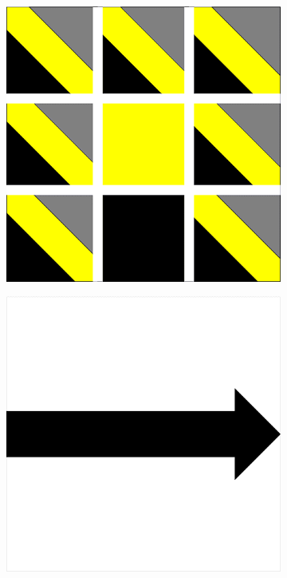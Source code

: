 \documentclass[a4paper]{article}
\begin{document}
\begin{figure}[!h]
    \centering
    \begin{subfigure}[t]{0.17\textwidth}
        \includegraphics[width=\textwidth]{img/rule10.png}
    \end{subfigure}
    \hfill
    \begin{subfigure}[t]{0.17\textwidth} 
        \includegraphics[width=\textwidth]{img/fleche3.png} 

\end{subfigure}
\end{figure}
\end{document}
